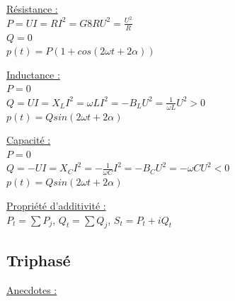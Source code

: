 \documentclass[../main.tex]{subfiles}
\begin{document}
\begin{minipage}{.3\textwidth}
\quad \underline{Résistance :}\\
$P = UI = RI^2 = G8R U^2 = \frac{U^2}{R}$\\
$Q = 0$\\
$p(t) = P(1+cos(2\omega t+2\alpha))$\\

\end{minipage}
\vline
\vline
\begin{minipage}{.3\textwidth}
\quad \underline{Inductance :}\\
$P = 0$\\
$Q = UI = X_L I^2 = \omega LI^2 = -B_LU^2 = \frac{1}{\omega L} U^2 >0$\\
$p(t) = Qsin(2\omega t+2\alpha)$\\
\end{minipage}
\vline
\vline
\begin{minipage}{.3\textwidth}
\quad \underline{Capacité :}\\
$P = 0$\\
$Q = -UI = X_C I^2 = -\frac{1}{\omega C}I^2 = -B_C U^2 = -\omega CU^2<0$\\
$p(t) = Qsin(2\omega t+2\alpha)$\\
\end{minipage}


\quad \underline{Propriété d'additivité :}\\
$P_t = \sum P_j$, $Q_t = \sum Q_j$, $S_t = P_t+iQ_t$

\subsection{Triphasé}
\quad \underline{Anecdotes :}\\
\end{document}
